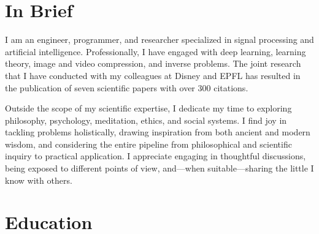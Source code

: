 \documentclass[a4paper,11pt]{article}
\begin{document}

  \vspace{25pt}

  \section{In Brief}
    I am an engineer, programmer, and researcher specialized in signal processing and artificial intelligence. Professionally, I have engaged with deep learning, learning theory, image and video compression, and inverse problems. The joint research that I have conducted with my colleagues at Disney and EPFL has resulted in the publication of seven scientific papers with over 300 citations.

    Outside the scope of my scientific expertise, I dedicate my time to exploring philosophy, psychology, meditation, ethics, and social systems. I find joy in tackling problems holistically, drawing inspiration from both ancient and modern wisdom, and considering the entire pipeline from philosophical and scientific inquiry to practical application. I appreciate engaging in thoughtful discussions, being exposed to different points of view, and—when suitable—sharing the little I know with others.

  \vspace{25pt}

  \section{Education}
\end{document}
